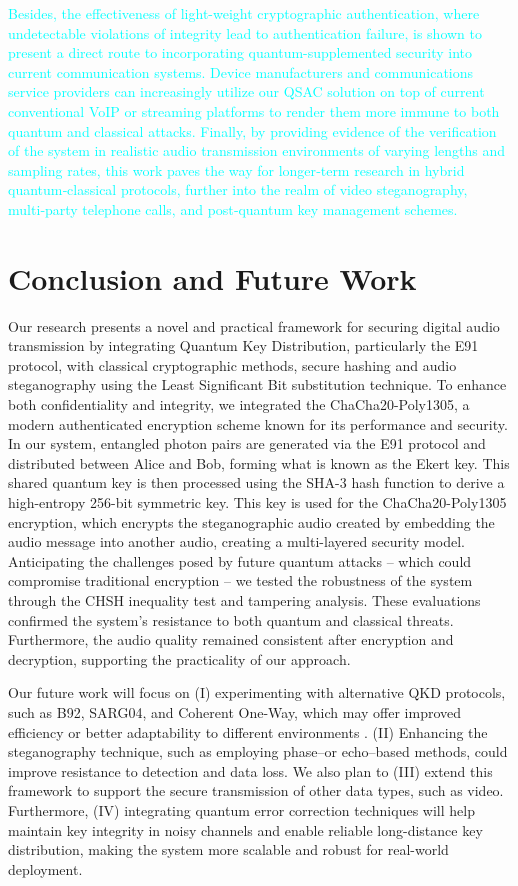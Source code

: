 \documentclass[a4paper]{cas-sc}
\begin{document}
\textcolor{cyan}{Besides, the effectiveness of light-weight cryptographic authentication, where undetectable violations of integrity lead to authentication failure, is shown to present a direct route to incorporating quantum-supplemented security into current communication systems. Device manufacturers and communications service providers can increasingly utilize our QSAC solution on top of current conventional VoIP or streaming platforms to render them more immune to both quantum and classical attacks. Finally, by providing evidence of the verification of the system in realistic audio transmission environments of varying lengths and sampling rates, this work paves the way for longer‑term research in hybrid quantum‑classical protocols, further into the realm of video steganography, multi‑party telephone calls, and post‑quantum key management schemes.}
\section{Conclusion and Future Work}
\label{sec:conclusion}
Our research presents a novel and practical framework for securing digital audio transmission by integrating Quantum Key Distribution, particularly the E91 protocol, with classical cryptographic methods, secure hashing and audio steganography using the Least Significant Bit substitution technique. To enhance both confidentiality and integrity, we integrated the ChaCha20-Poly1305, a modern authenticated encryption scheme known for its performance and security. In our system, entangled photon pairs are generated via the E91 protocol and distributed between Alice and Bob, forming what is known as the Ekert key. This shared quantum key is then processed using the SHA-3 hash function to derive a high-entropy 256-bit symmetric key. This key is used for the ChaCha20-Poly1305 encryption, which encrypts the steganographic audio created by embedding the audio message into another audio, creating a multi-layered security model. Anticipating the challenges posed by future quantum attacks -- which could compromise traditional encryption -- we tested the robustness of the system through the CHSH inequality test and tampering analysis. These evaluations confirmed the system's resistance to both quantum and classical threats. Furthermore, the audio quality remained consistent after encryption and decryption, supporting the practicality of our approach.

Our future work will focus on (I) experimenting with alternative QKD protocols, such as B92, SARG04, and Coherent One-Way, which may offer improved efficiency or better adaptability to different environments \cite{nurhadi2018quantum}. (II) Enhancing the steganography technique, such as employing phase--or echo--based methods, could improve resistance to detection and data loss. We also plan to (III) extend this framework to support the secure transmission of other data types, such as video. Furthermore, (IV) integrating quantum error correction techniques \cite{devitt2013quantum} will help maintain key integrity in noisy channels \cite{nagata2017quantum} and enable reliable long-distance key distribution, making the system more scalable and robust for real-world deployment.


\end{document}
